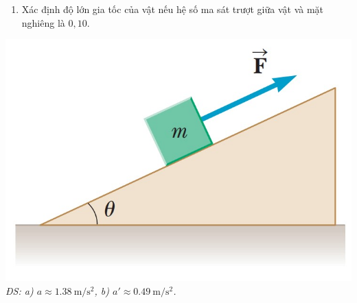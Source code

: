 \begin{tomtat}
\begin{vd}
{\begin{enumerate}[label=\alph*)]
		\item Xác định độ lớn gia tốc của vật nếu hệ số ma sát trượt giữa vật và mặt nghiêng là $0,10$.
	\end{enumerate}
	}
	{\includegraphics[scale=0.4]{figs/BTMASAT-5}}
	\null\hfill\textit{ĐS: a) $a\approx\SI{1.38}{\meter/\second^2}$, b) $a'\approx\SI{0.49}{\meter/\second^2}$.}
\end{vd}

\end{tomtat}
